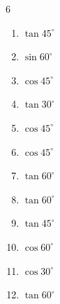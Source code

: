 \begin{multicols}{6}
\begin{enumerate}

  \item $\displaystyle \tan{45^\circ}$

        \phantom{$\displaystyle =1$}

  \item $\displaystyle \sin{60^\circ}$


  \item $\displaystyle \cos{45^\circ}$


  \item $\displaystyle \tan{30^\circ}$


  \item $\displaystyle \cos{45^\circ}$


  \item $\displaystyle \cos{45^\circ}$


  \item $\displaystyle \tan{60^\circ}$


  \item $\displaystyle \tan{60^\circ}$


  \item $\displaystyle \tan{45^\circ}$

        \phantom{$\displaystyle =1$}

  \item $\displaystyle \cos{60^\circ}$


  \item $\displaystyle \cos{30^\circ}$


  \item $\displaystyle \tan{60^\circ}$



\end{enumerate}
\end{multicols}
